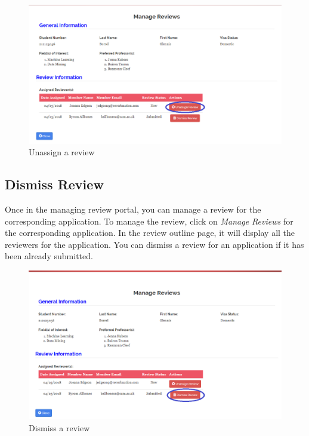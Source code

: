\documentclass[fontsize=12pt,paper=letter,twoside]{scrartcl}
\begin{document}
\begin{figure}[!htb]
\begin{center}
\includegraphics[width=.99\textwidth]{images/mr/unassign_review.png}
\end{center}
\caption{Unassign a review}
\label{fig:unassign_review}
\end{figure}

\clearpage
\subsection{Dismiss Review}
Once in the managing review portal, you can manage a review for the corresponding application. To manage the review, click on \emph{Manage Reviews} for the corresponding application. In the review outline page, it will display all the reviewers for the application. You can dismiss a review for an application if it has been already submitted.

\begin{figure}[!htb]
\begin{center}
\includegraphics[width=.99\textwidth]{images/mr/dismiss_review.png}
\end{center}
\caption{Dismiss a review}
\label{fig:dismiss_review}
\end{figure}
\end{document}
